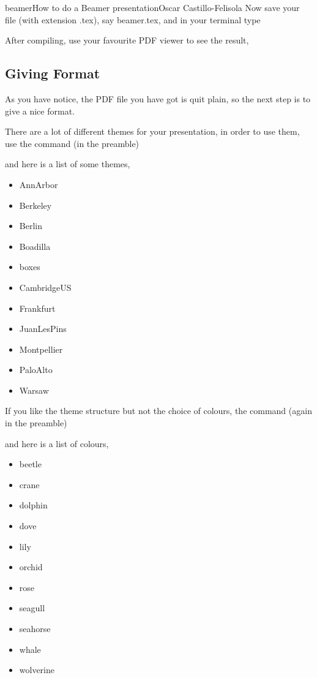 \begin{article}[2]{beamer}{How to do a Beamer presentation}{Oscar Castillo-Felisola}
  Now save your file (with extension .tex), say  beamer.tex, and in your terminal type


  After compiling, use your favourite PDF viewer to see the result,


  \subsection{Giving Format}

  As you have notice, the PDF file you have got is quit plain, so the next step is to give a nice format.

  There are a lot of different themes for your presentation, in order to use them, use the command (in the preamble)


  and here is a list of some themes,

  \begin{itemize}
  \item AnnArbor
  \item Berkeley
  \item Berlin
  \item Boadilla
  \item boxes
  \item CambridgeUS
  \item Frankfurt
  \item JuanLesPins
  \item Montpellier
  \item PaloAlto
  \item Warsaw
  \end{itemize}

  If you like the theme structure but not the choice of colours, the command (again in the preamble)


  and here is a list of colours,

  \begin{itemize}
  \item beetle
  \item crane
  \item dolphin
  \item dove
  \item lily
  \item orchid
  \item rose
  \item seagull
  \item seahorse
  \item whale
  \item wolverine
  \end{itemize}


\end{article}
